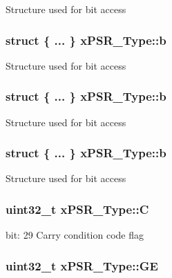 Structure used for bit access \hypertarget{unionx_p_s_r___type_a35f742ca1c07eab4859f2b004b7061c8}{
\subsubsection[{b}]{\setlength{\rightskip}{0pt plus 5cm}struct \{ ... \}   x\-P\-S\-R\-\_\-\-Type\-::b}}\label{unionx_p_s_r___type_a35f742ca1c07eab4859f2b004b7061c8}
Structure used for bit access \hypertarget{unionx_p_s_r___type_a37909be48c1aeb4c53382e98e4a3fe4b}{
\subsubsection[{b}]{\setlength{\rightskip}{0pt plus 5cm}struct \{ ... \}   x\-P\-S\-R\-\_\-\-Type\-::b}}\label{unionx_p_s_r___type_a37909be48c1aeb4c53382e98e4a3fe4b}
Structure used for bit access \hypertarget{unionx_p_s_r___type_a77bf98b729cf318cc11a0e21fe6ce04f}{
\subsubsection[{b}]{\setlength{\rightskip}{0pt plus 5cm}struct \{ ... \}   x\-P\-S\-R\-\_\-\-Type\-::b}}\label{unionx_p_s_r___type_a77bf98b729cf318cc11a0e21fe6ce04f}
Structure used for bit access \hypertarget{unionx_p_s_r___type_a40213a6b5620410cac83b0d89564609d}{
\subsubsection[{C}]{\setlength{\rightskip}{0pt plus 5cm}uint32\-\_\-t x\-P\-S\-R\-\_\-\-Type\-::\-C}}\label{unionx_p_s_r___type_a40213a6b5620410cac83b0d89564609d}
bit\-: 29 Carry condition code flag \hypertarget{unionx_p_s_r___type_a2d0ec4ccae337c1df5658f8cf4632e76}{
\subsubsection[{G\-E}]{\setlength{\rightskip}{0pt plus 5cm}uint32\-\_\-t x\-P\-S\-R\-\_\-\-Type\-::\-G\-E}}\label{unionx_p_s_r___type_a2d0ec4ccae337c1df5658f8cf4632e76}

